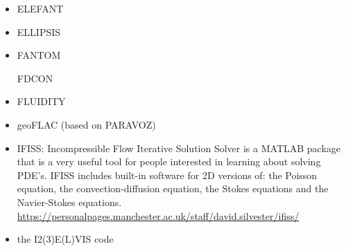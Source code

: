 \begin{itemize}
\item ELEFANT

\cite{tosn15}
\cite{matv15}
\cite{busa16}
\cite{latb17}
\cite{thie17}
\cite{pltv18}
\cite{wohu19}

\item ELLIPSIS

\cite{modm03}
\cite{omma06} 
\cite{moql07}
\cite{dyrm07}
\cite{onlg08}
\cite{pyeg10}
\cite{legu11}
\cite{lega12}


\item FANTOM

\cite{thie11}
\cite{alht11}
\cite{alht12}
\cite{alhf13}
\cite{erhv14}
\cite{thsh14}
\cite{erhv15}
\cite{erhv19}

\index FDCON
\cite{enbs05}
\cite{fusc13}
\cite{fuks15}


\item FLUIDITY
\cite{dawk11}
\cite{gagd14}

\item geoFLAC (based on PARAVOZ)
\cite{jala19}

\item IFISS: Incompressible Flow Iterative Solution Solver is a
MATLAB package that is a very useful tool for people interested in
learning about solving PDE’s.
IFISS includes built-in software for 2D versions of:
the Poisson equation, the convection-diffusion equation, the Stokes equations
and the Navier-Stokes equations.\\
\url{https://personalpages.manchester.ac.uk/staff/david.silvester/ifiss/}



\item the I2(3)E(L)VIS code

\cite{geyu03}\cite{geyu03b}\cite{geur03}
\cite{geym04}\cite{geys04}\cite{gepm04}
\cite{buge05}
\cite{bbeg06}\cite{gest06}\cite{gogc06}\cite{gecy06}
\cite{geyu07}\cite{gogc07}
\cite{scbe08}\cite{gecy08}\cite{uegs08}\cite{fagc08}\cite{zgyh09}
\cite{gefc09}
\cite{gerya2010}\cite{nigm10}
\cite{dugm11}\cite{dumg11}\cite{lixg11}\cite{gery11}\cite{geme11}
\cite{crsg12}\cite{dugk12}\cite{lixg12}
\cite{lixg13}\cite{nabg13}\cite{magc13}\cite{digd13a}\cite{digd13b}\cite{zhgt13}\cite{dyge13}\cite{gemd13}\cite{mana13}
\cite{dugs14}\cite{puge14}\cite{rugb14}\cite{voge14b}\cite{bagb14}\cite{lige14}\cite{stjm14}\cite{malg14}
\cite{buge14}\cite{gosk14}\cite{bagb14}\cite{vamd14}
\cite{duay15}\cite{uewg15}\cite{rula15}\cite{gesb15}\cite{rula15}
\cite{kobc16}\cite{magc16}\cite{fige16}
\cite{kobg19}\cite{ligc19}


\end{itemize}
